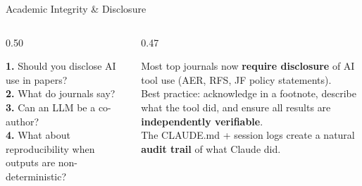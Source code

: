 \documentclass[aspectratio=169, 11pt]{beamer}
\newcommand{\emphgold}[1]{\alert{\textbf{#1}}}
\newcommand{\emphsage}[1]{\textcolor{green!60!black}{\textbf{#1}}}
\begin{document}
\begin{frame}{Academic Integrity \& Disclosure}
\begin{columns}[T]
\begin{column}{0.50\textwidth}
  \begin{warningbox}
    {\small
    \emphgold{1.} Should you disclose AI use in papers?\\[3pt]
    \emphgold{2.} What do journals say?\\[3pt]
    \emphgold{3.} Can an LLM be a co-author?\\[3pt]
    \emphgold{4.} What about reproducibility when outputs are non-deterministic?}
  \end{warningbox}
\end{column}
\begin{column}{0.47\textwidth}
  \begin{keyinsight}
    {\small Most top journals now \emphgold{require disclosure} of AI tool use (AER, RFS, JF policy statements).\\[4pt]
    Best practice: acknowledge in a footnote, describe what the tool did, and ensure all results are \emphgold{independently verifiable}.\\[4pt]
    The CLAUDE.md + session logs create a natural \emphsage{audit trail} of what Claude did.}
  \end{keyinsight}
\end{column}
\end{columns}
\end{frame}
\end{document}
